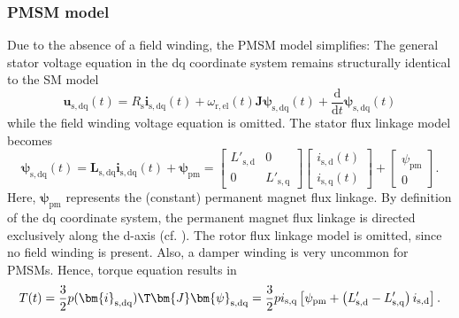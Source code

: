 \begin{frame}
	\frametitle{PMSM model}
	Due to the absence of a field winding, the PMSM model simplifies: The general stator voltage equation in the dq coordinate system remains structurally identical to the SM model
	$$\bm{u}_\mathrm{s,dq}(t) = R_\mathrm{s} \bm{i}_\mathrm{s,dq}(t)+ \omega_\mathrm{r,el}(t)\bm{J}\bm{\psi}_\mathrm{s,dq}(t) + \frac{\mathrm{d}}{\mathrm{d}t}\bm{\psi}_\mathrm{s,dq}(t)$$
	while the field winding voltage equation is omitted. \pause The stator flux linkage model becomes
	\begin{equation}
		\bm{\psi}_\mathrm{s,dq}(t) = \bm{L}_\mathrm{s,dq}\bm{i}_{\mathrm{s,dq}}(t) + \bm{\psi}_\mathrm{pm} = \begin{bmatrix}
			L'_\mathrm{s,d} & 0\\
			0 & L'_\mathrm{s,q}
		\end{bmatrix} \begin{bmatrix}
			i_{\mathrm{s,d}}(t) \\ i_{\mathrm{s,q}}(t)
		\end{bmatrix} + \begin{bmatrix}
			\psi_\mathrm{pm} \\ 0
		\end{bmatrix}.
	\end{equation}
	Here, $\bm{\psi}_\mathrm{pm}$ represents the (constant) permanent magnet flux linkage. \pause By definition of the dq coordinate system, the permanent magnet flux linkage is directed exclusively along the d-axis (cf. ). The rotor flux linkage model is omitted, since no field winding is present. Also, a damper winding is very uncommon for PMSMs. \pause Hence, torque equation results in
	\begin{equation}
		T(t) = \frac{3}{2} p (\bm{i}_\mathrm{s,dq})\T\bm{J}\bm{\psi}_\mathrm{s,dq} = \frac{3}{2} p i_\mathrm{s,q}\left[ \psi_\mathrm{pm} + \left(L'_\mathrm{s,d}-L'_\mathrm{s,q}\right)i_\mathrm{s,d}\right].
	\end{equation}
\end{frame}

